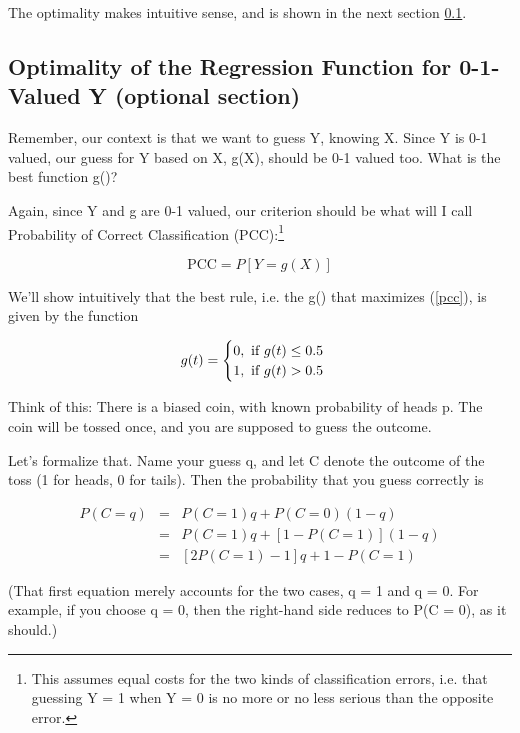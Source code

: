 The optimality makes intuitive sense, and is shown in the next section
\ref{optimal2}. 

\subsection{Optimality of the Regression Function for 0-1-Valued Y
(optional section)}
\label{optimal2}

Remember, our context is that we want to guess Y, knowing X.  Since Y is
0-1 valued, our guess for Y based on X, g(X), should be 0-1 valued too.
What is the best function g()?

Again, since Y and g are 0-1 valued, our criterion should be what will I
call Probability of Correct Classification (PCC):\footnote{This assumes
equal costs for the two kinds of classification errors, i.e. that
guessing Y = 1 when Y = 0 is no more or no less serious than the
opposite error.}

\begin{equation}
\label{pcc}
\textrm{PCC} = P[Y = g(X)]
\end{equation}

We'll show intuitively that the best rule, i.e. the g() that maximizes
(\ref{pcc}), is given by the function

\begin{equation}
g(t) = 
\begin{cases}
0, \textrm{ if } g(t) \leq 0.5 \cr
1, \textrm{ if } g(t) > 0.5 \cr
\end{cases}
\end{equation}

Think of this:  There is a biased coin, with known probability of heads
p.  The coin will be tossed once, and you are supposed to guess the
outcome.  

Let's formalize that.  Name your guess q, and let C denote the outcome
of the toss (1 for heads, 0 for tails).  Then the probability that you
guess correctly is

\begin{eqnarray}
P(C = q) &=& P(C = 1) q + P(C = 0) (1-q) \\ 
&=& P(C = 1) q + [1 - P(C = 1)] (1-q) \\ 
&=& [2 P(C = 1) - 1] q + 1 - P(C = 1) 
\end{eqnarray}

(That first equation merely accounts for the two cases, q = 1 and q =
0.  For example, if you choose q = 0, then the right-hand side reduces
to P(C = 0), as it should.)


